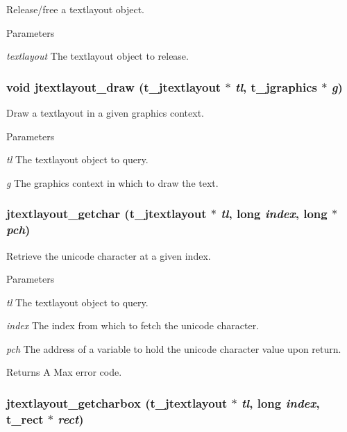 Release/free a textlayout object. 
\begin{DoxyParams}{Parameters}
\item[{\em textlayout}]The textlayout object to release. \end{DoxyParams}
\hypertarget{group__textlayout_gada972c6fcde61e14fec99a02d88bf131}{
\subsubsection[{jtextlayout\_\-draw}]{\setlength{\rightskip}{0pt plus 5cm}void jtextlayout\_\-draw ({\bf t\_\-jtextlayout} $\ast$ {\em tl}, \/  {\bf t\_\-jgraphics} $\ast$ {\em g})}}
\label{group__textlayout_gada972c6fcde61e14fec99a02d88bf131}


Draw a textlayout in a given graphics context. 
\begin{DoxyParams}{Parameters}
\item[{\em tl}]The textlayout object to query. \item[{\em g}]The graphics context in which to draw the text. \end{DoxyParams}
\hypertarget{group__textlayout_ga6e1b7c2d44d3cbcb051eda74d8e47ef1}{
\subsubsection[{jtextlayout\_\-getchar}]{ jtextlayout\_\-getchar ({\bf t\_\-jtextlayout} $\ast$ {\em tl}, \/  long {\em index}, \/  long $\ast$ {\em pch})}}
\label{group__textlayout_ga6e1b7c2d44d3cbcb051eda74d8e47ef1}


Retrieve the unicode character at a given index. 
\begin{DoxyParams}{Parameters}
\item[{\em tl}]The textlayout object to query. \item[{\em index}]The index from which to fetch the unicode character. \item[{\em pch}]The address of a variable to hold the unicode character value upon return. \end{DoxyParams}
\begin{DoxyReturn}{Returns}
A Max error code. 
\end{DoxyReturn}
\hypertarget{group__textlayout_gab251f42f6b58c3dd3d55a3454c82e34a}{
\subsubsection[{jtextlayout\_\-getcharbox}]{ jtextlayout\_\-getcharbox ({\bf t\_\-jtextlayout} $\ast$ {\em tl}, \/  long {\em index}, \/  {\bf t\_\-rect} $\ast$ {\em rect})}}
\label{group__textlayout_gab251f42f6b58c3dd3d55a3454c82e34a}


